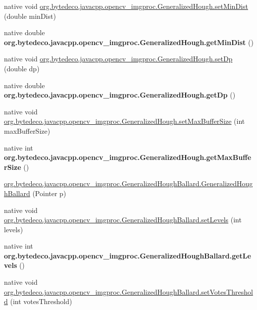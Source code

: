 \begin{DoxyCompactItemize}
\item 
native void \hyperlink{group__imgproc_gaccebfd3efbb606d9af90fde480a93a79}{org.\+bytedeco.\+javacpp.\+opencv\+\_\+imgproc.\+Generalized\+Hough.\+set\+Min\+Dist} (double min\+Dist)
\item 
\mbox{\label{group__imgproc_ga2c9bd9f705ac3c0622e4db84f237cc45}} 
native double {\bfseries org.\+bytedeco.\+javacpp.\+opencv\+\_\+imgproc.\+Generalized\+Hough.\+get\+Min\+Dist} ()
\item 
native void \hyperlink{group__imgproc_ga08c264185f923eab1e7b28a97c8a99ae}{org.\+bytedeco.\+javacpp.\+opencv\+\_\+imgproc.\+Generalized\+Hough.\+set\+Dp} (double dp)
\item 
\mbox{\label{group__imgproc_gad336797438d098ffe50eaac1e40f01a3}} 
native double {\bfseries org.\+bytedeco.\+javacpp.\+opencv\+\_\+imgproc.\+Generalized\+Hough.\+get\+Dp} ()
\item 
native void \hyperlink{group__imgproc_gaad80aee63ad33db9cbf990de857c2794}{org.\+bytedeco.\+javacpp.\+opencv\+\_\+imgproc.\+Generalized\+Hough.\+set\+Max\+Buffer\+Size} (int max\+Buffer\+Size)
\item 
\mbox{\label{group__imgproc_ga3a7aa9225ecd17c709e564a515334ec2}} 
native int {\bfseries org.\+bytedeco.\+javacpp.\+opencv\+\_\+imgproc.\+Generalized\+Hough.\+get\+Max\+Buffer\+Size} ()
\item 
\hyperlink{group__imgproc_ga89c305064b6777998f61c86e5929aee5}{org.\+bytedeco.\+javacpp.\+opencv\+\_\+imgproc.\+Generalized\+Hough\+Ballard.\+Generalized\+Hough\+Ballard} (Pointer p)
\item 
native void \hyperlink{group__imgproc_ga08916f9b4499b2356dd542266564dec0}{org.\+bytedeco.\+javacpp.\+opencv\+\_\+imgproc.\+Generalized\+Hough\+Ballard.\+set\+Levels} (int levels)
\item 
\mbox{\label{group__imgproc_gaebebc237a19df864a5b82fd4fc2a1527}} 
native int {\bfseries org.\+bytedeco.\+javacpp.\+opencv\+\_\+imgproc.\+Generalized\+Hough\+Ballard.\+get\+Levels} ()
\item 
native void \hyperlink{group__imgproc_ga25a1e73a7d5ff7fe78971cb34fd6706c}{org.\+bytedeco.\+javacpp.\+opencv\+\_\+imgproc.\+Generalized\+Hough\+Ballard.\+set\+Votes\+Threshold} (int votes\+Threshold)
\item 
\mbox{\label{group__imgproc_gac53696fad5c3434ffc57f8c70dd872e8}} 

\end{DoxyCompactItemize}
